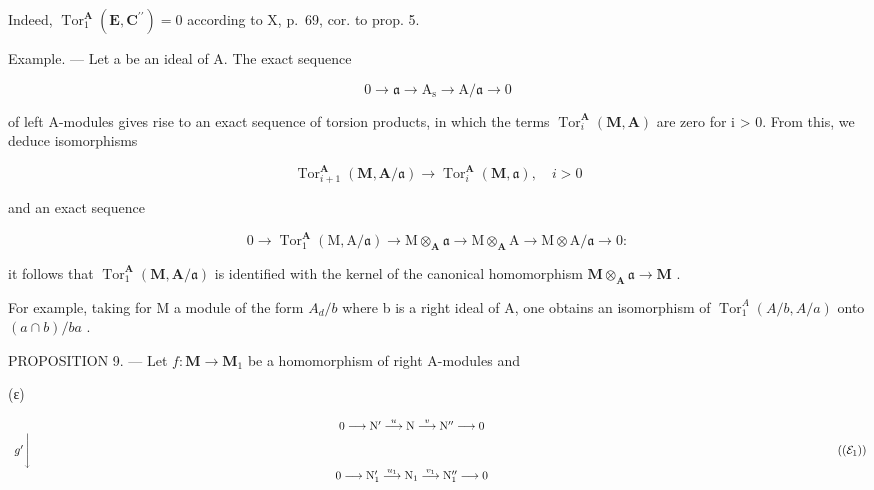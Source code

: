 Indeed, \(\operatorname{Tor}_1^{\mathbf{A}}(\mathbf{E},\mathbf{C}^{\prime \prime}) = 0\) according to X, p.~69, cor. to prop. 5.

Example. --- Let a be an ideal of A. The exact sequence

\[
0 \rightarrow \mathfrak {a} \rightarrow \mathrm{A} _ {\mathrm{s}} \rightarrow \mathrm{A} / \mathfrak {a} \rightarrow 0
\]

of left A-modules gives rise to an exact sequence of torsion products, in which the terms \(\operatorname{Tor}_{i}^{\mathbf{A}}(\mathbf{M},\mathbf{A})\) are zero for i \textgreater{} 0. From this, we deduce isomorphisms

\[
\operatorname{Tor} _ {i + 1} ^ {\mathbf {A}} (\mathbf {M}, \mathbf {A} / \mathfrak {a}) \rightarrow \operatorname{Tor} _ {i} ^ {\mathbf {A}} (\mathbf {M}, \mathfrak {a}), \quad i > 0
\]

and an exact sequence

\[
0 \rightarrow \operatorname{Tor} _ {1} ^ {\mathbf {A}} (\mathrm{M}, \mathrm{A} / \mathfrak {a}) \rightarrow \mathrm{M} \otimes_ {\mathbf {A}} \mathfrak {a} \rightarrow \mathrm{M} \otimes_ {\mathbf {A}} \mathrm{A} \rightarrow \mathrm{M} \otimes \mathrm{A} / \mathfrak {a} \rightarrow 0:
\]

it follows that \(\operatorname{Tor}_{1}^{\mathbf{A}}(\mathbf{M},\mathbf{A}/\mathfrak{a})\) is identified with the kernel of the canonical homomorphism \(\mathbf{M}\otimes_{\mathbf{A}}\mathfrak{a}\to\mathbf{M}\) .

For example, taking for M a module of the form \(A_{d}/b\) where b is a right ideal of A, one obtains an isomorphism of \(\operatorname{Tor}_{1}^{A}(A/b, A/a)\) onto \((a \cap b)/ba\) .

PROPOSITION 9. --- Let \(f: \mathbf{M} \to \mathbf{M}_{1}\) be a homomorphism of right A-modules and

(ε)

\[
\begin{array}{c} 0 \longrightarrow \mathrm{N} ^ {\prime} \stackrel {{u}} {{\longrightarrow}} \mathrm{N} \stackrel {{v}} {{\longrightarrow}} \mathrm{N} ^ {\prime \prime} \longrightarrow 0 \\ g ^ {\prime} \Biggl \downarrow \qquad \qquad \qquad \qquad \qquad \qquad \qquad \qquad \qquad \qquad \qquad \qquad \qquad \qquad \qquad \qquad \qquad \qquad \qquad \qquad \qquad \qquad \qquad \qquad \qquad \qquad \qquad \qquad \qquad \qquad \qquad \qquad \qquad \qquad \\ 0 \longrightarrow \mathrm{N} _ {1} ^ {\prime} \stackrel {{u _ {1}}} {{\longrightarrow}} \mathrm{N} _ {1} \stackrel {{v _ {1}}} {{\longrightarrow}} \mathrm{N} _ {1} ^ {\prime \prime} \longrightarrow 0 \end{array}\tag{$(\mathcal{E}_1)$}
\]

